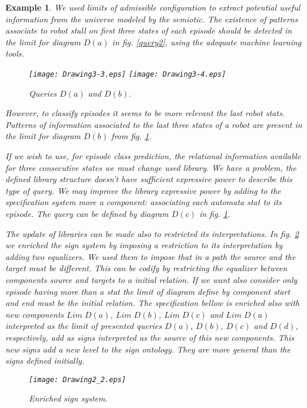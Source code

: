 \documentclass[oribibl]{llncs}
\newtheorem{exam}{Example}
\begin{document}
\begin{exam}
We used limits of admissible configuration to extract potential useful information from the universe modeled by the semiotic. The existence of patterns associate to robot stall on first three states of each episode should be detected in the limit for diagram $D(a)$ in fig. \ref{query2}, using the adequate machine learning tools.
\begin{figure}[h]
    \begin{center}
    \texttt{[image: Drawing3-3.eps]}
    \texttt{[image: Drawing3-4.eps]}
    \end{center}
    \caption{Queries $D(a)$ and $D(b)$.}\label{query2}\label{query3}
\end{figure}
However, to classify episodes it seems to be more relevant the last robot stats. Patterns of information associated to the last three states of a robot are present in the limit for diagram $D(b)$ from fig. \ref{query3}.

If we wish to use, for episode class prediction, the relational information available for three consecutive states we must change used library. We have a problem, the defined library structure doesn't have sufficient expressive power to describe this type of query. We may improve the library expressive power by adding to the specification system more a component: associating each automata stat to its episode. The query can be defined by diagram $D(c)$ in fig. \ref{query3}.

The update of libraries can be made also to restricted its interpretations. In fig. \ref{enrichsemiotic} we enriched the sign system by imposing a restriction to its interpretation by adding two equalizers. We used them to impose that in a path the source and the target must be different. This can be codify by restricting the equalizer between components \emph{source} and \emph{targets} to a initial relation. If we want also consider only episode having more than a stat the limit of diagram define by component \emph{start} and \emph{end} must be the initial relation. The specification bellow is enriched also with new components $Lim\;D(a)$, $Lim\;D(b)$, $Lim\;D(c)$ and $Lim\;D(a)$ interpreted as the limit of presented queries $D(a)$, $D(b)$, $D(c)$ and $D(d)$, respectively, add as signs interpreted as the source of this new components. This new signs add a new level to the sign ontology. They are more general than the signs defined initially.

\begin{figure}[h]
    \begin{center}
    \texttt{[image: Drawing2\_2.eps]}
    \end{center}
    \caption{Enriched sign system.}\label{enrichsemiotic}
\end{figure}


\end{exam}
\end{document}

